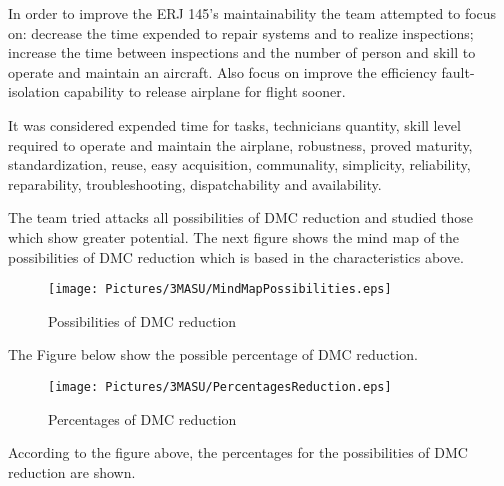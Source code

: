 
In order to improve the ERJ 145's maintainability the team attempted to focus on: decrease the time expended to repair systems and to realize inspections; increase the time between inspections and the number of person and skill to operate and maintain an aircraft. Also focus on improve the efficiency fault-isolation capability to release airplane for flight sooner.

It was considered expended time for tasks, technicians quantity, skill level required to operate and maintain the airplane, robustness, proved maturity, standardization, reuse, easy acquisition, communality, simplicity, reliability, reparability, troubleshooting, dispatchability and availability.

The team tried attacks all possibilities of DMC reduction and studied those which show greater potential. The next figure shows the mind map of the possibilities of DMC reduction which is based in the characteristics above.

\begin{figure}[H]
	\centering
	\texttt{[image: Pictures/3MASU/MindMapPossibilities.eps]}
	\caption{Possibilities of DMC reduction}
	\label{fig:MindMapDMCReduction}
\end{figure}

The Figure below show the possible percentage of DMC reduction.

\begin{figure}[H]
	\centering
	\texttt{[image: Pictures/3MASU/PercentagesReduction.eps]}
	\caption{Percentages of DMC reduction}
	\label{fig:PercentagemDMC}
\end{figure}

According to the figure above, the percentages for the possibilities of DMC reduction are shown.
